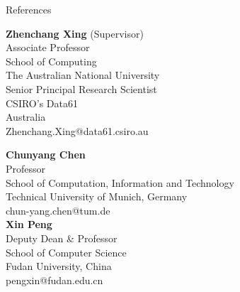 \documentclass[
	11pt, %
]{resume} %
\begin{document}
\begin{rSection}{References}

\noindent
\begin{minipage}[t]{0.48\linewidth}\raggedright
\textbf{Zhenchang Xing} (Supervisor)\\
Associate Professor\\
School of Computing\\
The Australian National University\\
Senior Principal Research Scientist\\ 
CSIRO's Data61\\
Australia\\[0.2em]
Zhenchang.Xing@data61.csiro.au
\end{minipage}\hfill
\begin{minipage}[t]{0.48\linewidth}\raggedright
\textbf{Chunyang Chen}\\
Professor\\
School of Computation, Information and Technology\\
Technical University of Munich, Germany\\[0.2em]
chun-yang.chen@tum.de\\[1em]
\textbf{Xin Peng}\\
Deputy Dean \& Professor\\
School of Computer Science\\
Fudan University, China\\[0.2em]
pengxin@fudan.edu.cn
\end{minipage}
\end{rSection}





\end{document}
